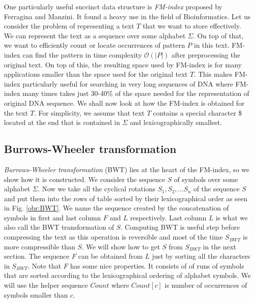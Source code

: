One particularly useful succinct data structure is \textit{FM-index} proposed by Ferragina
and Manzini\cite{ferragina2000opportunistic}. It found a heavy use in the field of
Bioinformatics. Let us consider the problem of representing a text $T$ that we want to
store effectively. We can represent the text as a sequence over some alphabet $\Sigma$.
On top of that, we want to efficiently count or locate occurrences of pattern $P$
in this text. FM-index can find the pattern in time complexity $\mathcal{O}(|P|)$
after preprocessing the original text. On top of this, the resulting
space used by FM-index is for many applications smaller than the space used for the
original text $T$. This makes FM-index particularly useful for searching in very long sequences
of DNA where FM-index many times takes just 30-40\% of the space needed for the representation
of original DNA sequence. We shall now look at how the FM-index is obtained for the text $T$.
For simplicity, we assume that text $T$ contains a special character \$ located at the end
that is contained in $\Sigma$ and lexicographically smallest.

\subsection{Burrows-Wheeler transformation}

\textit{Burrows-Wheeler transformation} (BWT) lies at the heart of the FM-index, so we show
how it is constructed. We consider the sequence $S$ of symbols over
some alphabet $\Sigma$. Now we take all the cyclical rotations $S_1, S_2, \ldots S_n$ of the
sequence $S$ and put them into the rows of table sorted by their lexicographical order as
seen in Fig. \ref{obr:BWT}. We name the sequence created by the concatenation of symbols
in first and last column $F$ and $L$ respectively. Last column $L$ is what we also call
the BWT transformation of $S$. Computing BWT is useful step before compressing
the text as this operation is reversible and most of the time $S_{BWT}$ is more compressible
than $S$. We will show how to get $S$ from $S_{BWT}$ in the next section. The sequence $F$ can
be obtained from $L$ just by sorting all the characters in $S_{BWT}$. Note that $F$ has some
nice properties. It consists of of runs of symbols that are sorted according to the lexicographical
ordering of alphabet symbols. We will use the helper sequence $Count$ where $Count[c]$ is
number of occurrences of symbols smaller than $c$.

